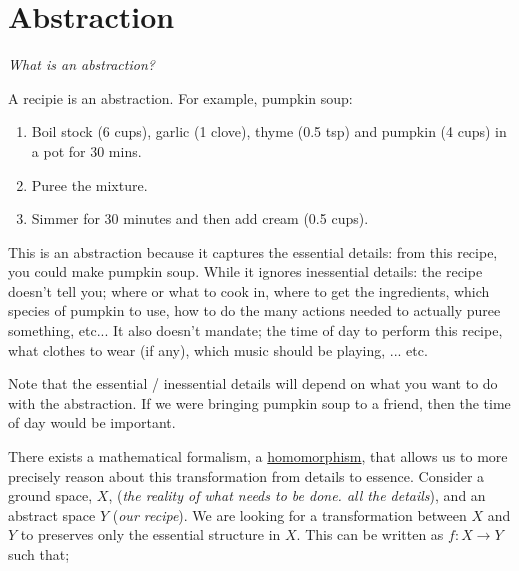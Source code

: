\chapter{Abstraction}\label{C:abstraction}


\begin{displayquote}
 \textit{What is an abstraction?}
\end{displayquote}

A recipie is an abstraction. For example, pumpkin soup:

\begin{enumerate}
\tightlist
\item Boil stock (6 cups), garlic (1 clove), thyme (0.5 tsp) and pumpkin (4 cups) in a pot for 30 mins.
\item Puree the mixture.
\item Simmer for 30 minutes and then add cream (0.5 cups).
\end{enumerate}

This is an abstraction because it captures the essential details: from this recipe, you could make pumpkin soup.
While it ignores inessential details: the recipe doesn't tell you; where or what to cook in, where to get the
ingredients, which species of pumpkin to use, how to do the many actions needed to actually puree something, etc...
It also doesn't mandate; the time of day to perform this recipe, what clothes to wear (if any),
which music should be playing, ... etc.

Note that the essential / inessential details will depend on what you want to do with the abstraction.
If we were bringing pumpkin soup to a friend, then the time of day would be important.

\vspace{5mm}

There exists a mathematical formalism, a  \href{https://en.wikipedia.org/wiki/Homomorphism}{homomorphism},
that allows us to more precisely reason about this transformation from
details to essence. Consider a ground space, $X$, (\textit{the reality of what
needs to be done. all the details}), and an abstract space $Y$ (\textit{our recipe}).
We are looking for a transformation between $X$ and $Y$ to preserves only the essential
structure in $X$. This can be written as $f: X\to Y$ such that;


